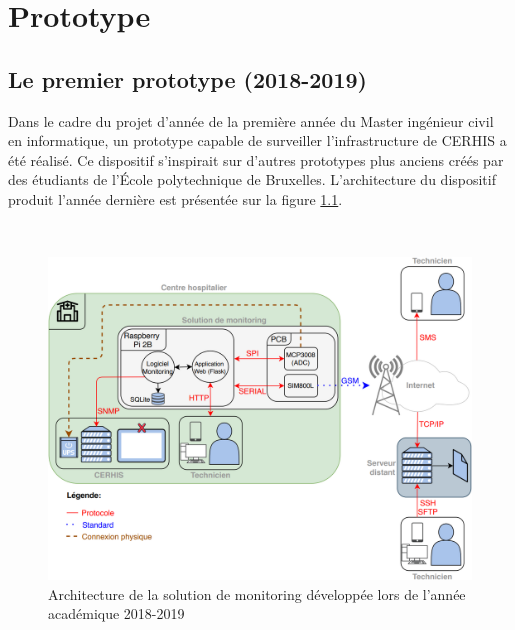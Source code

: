 \chapter{Prototype}
\label{chap:4}

\section{Le premier prototype (2018-2019)}
\label{sec:old_boy}

\noindent
Dans le cadre du projet d'année de la première année du Master ingénieur civil en informatique, un prototype capable de surveiller l'infrastructure de CERHIS a été réalisé. Ce dispositif s'inspirait sur d'autres prototypes plus anciens créés par des étudiants de l'École polytechnique de Bruxelles. L'architecture du dispositif produit l'année dernière est présentée sur la figure \ref{fig:archi_prev}.

~

\begin{figure}[ht!]
  \includegraphics[width=\textwidth]{img/el_prototype/archi_prev.png}
  \caption{Architecture de la solution de monitoring développée lors de l'année académique 2018-2019}
  \label{fig:archi_prev}
\end{figure}



